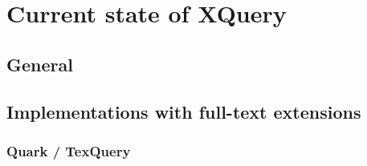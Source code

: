 \section{Current state of XQuery}
\subsection{General}
\subsection{Implementations with full-text extensions}
\subsubsection{Quark / TexQuery}